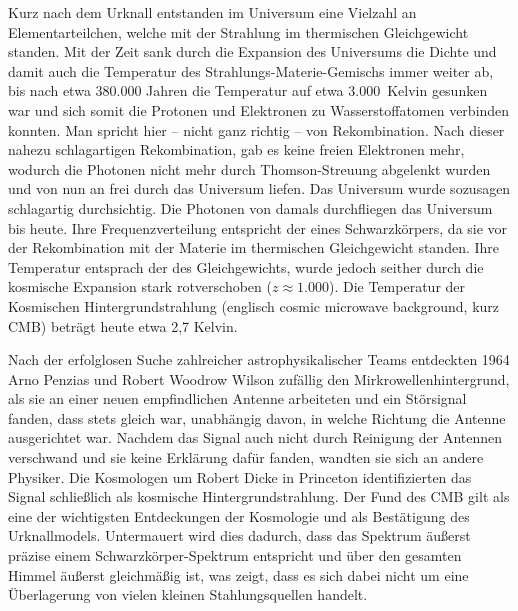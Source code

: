\documentclass[10pt,a4paper]{article}
\begin{document}
Kurz nach dem Urknall entstanden im Universum eine Vielzahl an Elementarteilchen, welche mit der Strahlung im thermischen Gleichgewicht standen. Mit der Zeit sank durch die Expansion des Universums die Dichte und damit auch die Temperatur des Strahlungs-Materie-Gemischs immer weiter ab, bis nach etwa 380.000 Jahren die Temperatur auf etwa 3.000\ Kelvin gesunken war und sich somit die Protonen und Elektronen zu Wasserstoffatomen verbinden konnten.
Man spricht hier -- nicht ganz richtig -- von Rekombination. Nach dieser nahezu schlagartigen Rekombination, gab es keine freien Elektronen mehr, wodurch die Photonen nicht mehr durch Thomson-Streuung abgelenkt wurden und von nun an frei durch das Universum liefen. Das Universum wurde sozusagen schlagartig durchsichtig. Die Photonen von damals durchfliegen das Universum bis heute. Ihre Frequenzverteilung entspricht der eines Schwarzkörpers, da sie vor der Rekombination mit der Materie im thermischen Gleichgewicht standen. Ihre Temperatur entsprach der des Gleichgewichts, wurde jedoch seither durch die kosmische Expansion stark rotverschoben ($z\approx 1.000$). Die Temperatur der Kosmischen Hintergrundstrahlung (englisch cosmic microwave background, kurz CMB) beträgt heute etwa 2,7 Kelvin.\cite{Schneider}

Nach der erfolglosen Suche zahlreicher astrophysikalischer Teams entdeckten 1964 Arno Penzias und Robert Woodrow Wilson zufällig den Mirkrowellenhintergrund, als sie an einer neuen empfindlichen Antenne arbeiteten und ein Störsignal fanden, dass stets gleich war, unabhängig davon, in welche Richtung die Antenne ausgerichtet war. Nachdem das Signal auch nicht durch Reinigung der Antennen verschwand und sie keine Erklärung dafür fanden, wandten sie sich an andere Physiker. Die Kosmologen um Robert Dicke in Princeton identifizierten das Signal schließlich als kosmische Hintergrundstrahlung.\cite{S+W00} Der Fund des CMB gilt als eine der wichtigsten Entdeckungen der Kosmologie und als Bestätigung des Urknallmodels. Untermauert wird dies dadurch, dass das Spektrum äußerst präzise einem Schwarzkörper-Spektrum entspricht und über den gesamten Himmel äußerst gleichmäßig ist, was zeigt, dass es sich dabei nicht um eine Überlagerung von vielen kleinen Stahlungsquellen handelt.
\end{document}
